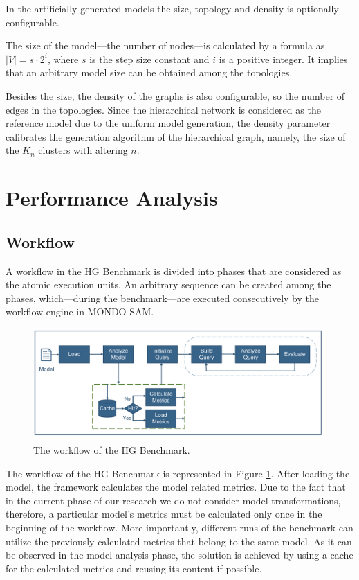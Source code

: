 In the artificially generated models the size, topology and density is optionally configurable. 

The size of the model---the number of nodes---is calculated by a formula as $|V| = s \cdot 2^i$, where $s$ is the step size constant and $i$ is a positive integer. It implies that an arbitrary model size can be obtained among the topologies.

Besides the size, the density of the graphs is also configurable, so the number of edges in the topologies. Since the hierarchical network is considered as the reference model due to the uniform model generation, the density parameter calibrates the generation algorithm of the hierarchical graph, namely, the size of the $K_n$ clusters with altering $n$. 

\section{Performance Analysis}

\subsection{Workflow}

A workflow in the HG Benchmark is divided into phases that are considered as the atomic execution units. An arbitrary sequence can be created among the phases, which---during the benchmark---are executed consecutively by the workflow engine in MONDO-SAM.

\begin{figure}[!ht]
	\centering
	\includegraphics[width=150mm, keepaspectratio]{figures/workflow.pdf}
	\caption{The workflow of the HG Benchmark.}
	\label{fig:mondo_map_workflow}
\end{figure}

The workflow of the HG Benchmark is represented in Figure \ref{fig:mondo_map_workflow}. After loading the model, the framework calculates the model related metrics. Due to the fact that in the current phase of our research we do not consider model transformations, therefore, a particular model's metrics must be calculated only once in the beginning of the workflow. More importantly, different runs of the benchmark can utilize the previously calculated metrics that belong to the same model. As it can be observed in the model analysis phase, the solution is achieved by using a cache for the calculated metrics and reusing its content if possible.

